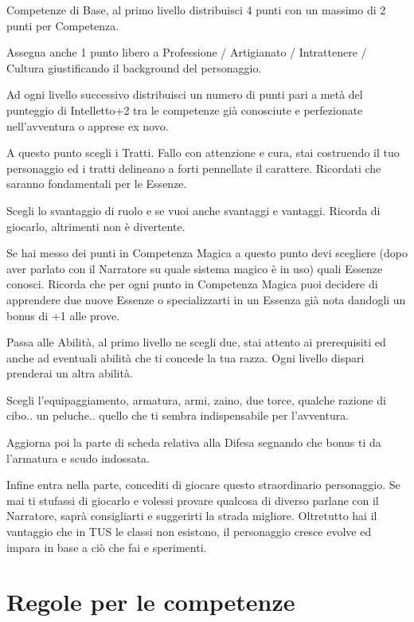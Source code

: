 \documentclass[a4paper,11pt,twoside,openany]{book}
\begin{document}
Competenze di Base, al primo livello distribuisci 4 punti con un massimo di 2 punti per Competenza.

Assegna anche 1 punto libero a Professione / Artigianato / Intrattenere / Cultura giustificando il background del personaggio.

Ad ogni livello successivo distribuisci un numero di punti pari a metà del punteggio di Intelletto+2 tra le competenze già conosciute e perfezionate nell'avventura o apprese ex novo.

A questo punto scegli i Tratti. Fallo con attenzione e cura, stai costruendo il tuo personaggio ed i tratti delineano a forti pennellate il carattere. Ricordati che saranno fondamentali per le Essenze.

Scegli lo svantaggio di ruolo e se vuoi anche svantaggi e vantaggi. Ricorda di giocarlo, altrimenti non è divertente.

Se hai messo dei punti in Competenza Magica a questo punto devi scegliere (dopo aver parlato con il Narratore su quale sistema magico è in uso) quali Essenze conosci. Ricorda che per ogni punto in Competenza Magica puoi decidere di apprendere due nuove Essenze o specializzarti in un Essenza già nota dandogli un bonus di +1 alle prove.

Passa alle Abilità, al primo livello ne scegli due, stai attento ai prerequisiti ed anche ad eventuali abilità che ti concede la tua razza. Ogni livello dispari prenderai un altra abilità.

Scegli l'equipaggiamento, armatura, armi, zaino, due torce, qualche razione di cibo.. un peluche.. quello che ti sembra indispensabile per l'avventura.

Aggiorna poi la parte di scheda relativa alla Difesa segnando che bonus ti da l'armatura e scudo indossata.

Infine entra nella parte, concediti di giocare questo straordinario personaggio. Se mai ti stufassi di giocarlo e volessi provare qualcosa di diverso parlane con il Narratore, saprà consigliarti e suggerirti la strada migliore.
Oltretutto hai il vantaggio che in TUS le classi non esistono, il personaggio cresce evolve ed impara in base a ciò che fai e sperimenti.

\pagebreak

\section{Regole per le competenze}
\end{document}
